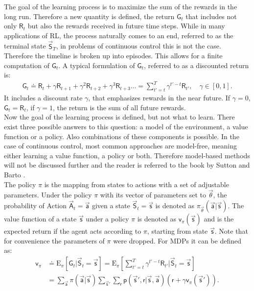 The goal of the learning process is to maximize the sum of the rewards in the long run. Therefore a new quantity is defined, the return $\mathsf{G}_t$ that includes not only $\mathsf{R}_t$ but also the rewards received in future time steps. While in many applications of RL, the process naturally comes to an end, referred to as the terminal state $\vec{\mathsf{S}}_T$, in problems of continuous control this is not the case. Therefore the timeline is broken up into episodes. This allows for a finite computation of $\mathsf{G}_t$. A typical formulation of $\mathsf{G}_t$, referred to as a discounted return is:
\begin{align}
\mathsf{G}_t \doteq \mathsf{R}_t + \gamma \mathsf{R}_{t+1} + \gamma^2 \mathsf{R}_{t+2} + \gamma^3 \mathsf{R}_{t+3}... = \sum_{t'=t}^{T}\gamma^{t'-t} \mathsf{R}_{t'},\quad \gamma \in [0, 1]. \label{eq:return}
\end{align}
It includes a discount rate $\gamma$, that emphasizes rewards in the near future. If $\gamma = 0$, $\mathsf{G}_t = \mathsf{R}_t$, if $\gamma = 1$, the return is the sum of all future rewards. \cite[p. 47- 57]{sutton_reinforcement_2018} \\
Now the goal of the learning process is defined, but not what to learn. There exist three possible answers to this question: a model of the environment, a value function or a policy. Also combinations of these components is possible. In the case of continuous control, most common approaches are model-free, meaning either learning a value function, a policy or both. Therefore model-based methods will not be discussed further and the reader is referred to the book by Sutton and Barto \cite{sutton_reinforcement_2018}. \\
The policy $\pi$ is the mapping from states to actions with a set of adjustable parameters. 
Under the policy $\pi$ with its vector of parameters set to $\vec{\theta}$, the probability of Action $\vec{\mathsf{A}}_t=\vec{\mathsf{a}}$ given a state $\vec{\mathsf{S}}_t=\vec{\mathsf{s}}$ is denoted as $\pi_{\vec{\theta}}(\vec{\mathsf{a}}|\vec{\mathsf{s}})$. The value function of a state $\vec{\mathsf{s}}$ under a policy $\pi$ is denoted as $\mathsf{v}_{\pi}(\vec{\mathsf{s}})$ and is the expected return if the agent acts according to $\pi$, starting from state $\vec{\mathsf{s}}$. Note that for convenience the parameters of $\pi$ were dropped. For MDPs it can be defined as: 
\begin{align}
	\mathsf{v}_{\pi} &\doteq \mathrm{E}_\pi \left[ \mathsf{G}_t \vert \vec{\mathsf{S}}_t= \vec{\mathsf{s}} \right] =
	\mathrm{E}_\pi \left[\sum_{t'=t}^{T}\gamma^{t'-t} \mathsf{R}_{t'} \vert \vec{\mathsf{S}}_t=\vec{\mathsf{s}}\right] \label{eq:value_func} \\
	&= \sum_{\vec{\mathsf{a}}} \pi(\vec{\mathsf{a}} \vert \vec{\mathsf{s}}) 
	\sum_{\vec{\mathsf{s}}'} \sum_{\mathsf{r}} \mathsf{p}(\vec{\mathsf{s}}',\mathsf{r} \vert \vec{\mathsf{s}},\vec{\mathsf{a}}) \left( \mathsf{r} + \gamma \mathsf{v}_\pi(\vec{\mathsf{s}}') \right). \label{eq:Bellmann}
\end{align}
